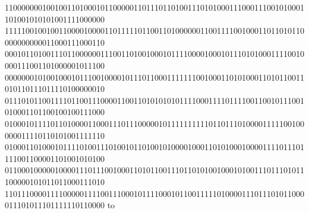 \documentclass[10pt,\tflang,dvips]{book}
\begin{document}
{{\begin{minipage}{\oldpwidth}
{{{{110000000100100110100010110000011011101101001110101000111000111001010001101001010101001111000000\blue\\
111110010010011000010000110111110110011010000001100111100100011011010110000000000011000111000110\blue\\
000101101001110110000001110011010010001011110000100010111010100011110010000111001101000001011100\blue\\
000000010100100010111001000010111011000111111100100011010100011010110011010110111011110100000010\blue\\
011101011001111011001110000110011010101010111100011110111100110010111001010001101100100100111000\blue\\
010001011110110100001100011101110000010111111111101101110100001111100100000011110110101001111110\blue\\
010001101000101111010011101001011010010100001000110101000100001111011101111001100001101001010100\blue\\
011000100000100001110111001000110101100111011010100100010100111011101011100000101011011000111010\blue\\
110111000011110000011110011100010111100010110011111010000111011101011000011101011101111110110000\blue
}}}}\fi
\vbox to
\end{minipage}}}
\end{document}
